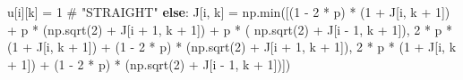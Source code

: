 \documentclass[
]{article}
\newenvironment{Shaded}{\begin{snugshade}}{\end{snugshade}}
\newcommand{\BuiltInTok}[1]{\textcolor[rgb]{0.00,0.23,0.31}{#1}}
\newcommand{\CommentTok}[1]{\textcolor[rgb]{0.37,0.37,0.37}{#1}}
\newcommand{\ControlFlowTok}[1]{\textcolor[rgb]{0.00,0.23,0.31}{\textbf{#1}}}
\newcommand{\DecValTok}[1]{\textcolor[rgb]{0.68,0.00,0.00}{#1}}
\newcommand{\NormalTok}[1]{\textcolor[rgb]{0.00,0.23,0.31}{#1}}
\newcommand{\OperatorTok}[1]{\textcolor[rgb]{0.37,0.37,0.37}{#1}}
\begin{document}
\begin{Shaded}
\begin{Highlighting}[]
\NormalTok{                u[i][k] }\OperatorTok{=} \DecValTok{1}  \CommentTok{\# "STRAIGHT"}
            \ControlFlowTok{else}\NormalTok{:}
\NormalTok{                J[i, k] }\OperatorTok{=}\NormalTok{ np.}\BuiltInTok{min}\NormalTok{([(}\DecValTok{1} \OperatorTok{{-}} \DecValTok{2} \OperatorTok{*}\NormalTok{ p) }\OperatorTok{*}\NormalTok{ (}\DecValTok{1} \OperatorTok{+}\NormalTok{ J[i, k }\OperatorTok{+} \DecValTok{1}\NormalTok{]) }\OperatorTok{+}\NormalTok{ p }\OperatorTok{*}\NormalTok{ (np.sqrt(}\DecValTok{2}\NormalTok{) }\OperatorTok{+}\NormalTok{ J[i }\OperatorTok{+} \DecValTok{1}\NormalTok{, k }\OperatorTok{+} \DecValTok{1}\NormalTok{]) }\OperatorTok{+}\NormalTok{ p }\OperatorTok{*}\NormalTok{ (}
\NormalTok{                        np.sqrt(}\DecValTok{2}\NormalTok{) }\OperatorTok{+}\NormalTok{ J[i }\OperatorTok{{-}} \DecValTok{1}\NormalTok{, k }\OperatorTok{+} \DecValTok{1}\NormalTok{]),}
                                  \DecValTok{2} \OperatorTok{*}\NormalTok{ p }\OperatorTok{*}\NormalTok{ (}\DecValTok{1} \OperatorTok{+}\NormalTok{ J[i, k }\OperatorTok{+} \DecValTok{1}\NormalTok{]) }\OperatorTok{+}\NormalTok{ (}\DecValTok{1} \OperatorTok{{-}} \DecValTok{2} \OperatorTok{*}\NormalTok{ p) }\OperatorTok{*}\NormalTok{ (np.sqrt(}\DecValTok{2}\NormalTok{) }\OperatorTok{+}\NormalTok{ J[i }\OperatorTok{+} \DecValTok{1}\NormalTok{, k }\OperatorTok{+} \DecValTok{1}\NormalTok{]),}
                                  \DecValTok{2} \OperatorTok{*}\NormalTok{ p }\OperatorTok{*}\NormalTok{ (}\DecValTok{1} \OperatorTok{+}\NormalTok{ J[i, k }\OperatorTok{+} \DecValTok{1}\NormalTok{]) }\OperatorTok{+}\NormalTok{ (}\DecValTok{1} \OperatorTok{{-}} \DecValTok{2} \OperatorTok{*}\NormalTok{ p) }\OperatorTok{*}\NormalTok{ (np.sqrt(}\DecValTok{2}\NormalTok{) }\OperatorTok{+}\NormalTok{ J[i }\OperatorTok{{-}} \DecValTok{1}\NormalTok{, k }\OperatorTok{+} \DecValTok{1}\NormalTok{])])}


\end{Highlighting}
\end{Shaded}
\end{document}
